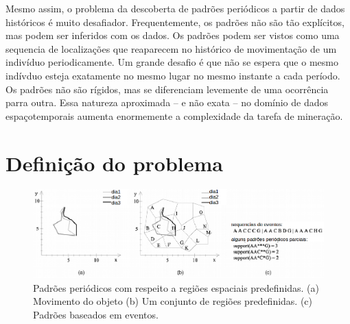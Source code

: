 \documentclass[ppgc,pep]{iiufrgs}
\begin{document}
Mesmo assim, o problema da descoberta de padrões periódicos a partir de
dados históricos é muito desafiador. Frequentemente, os padrões
não são tão explícitos, mas podem ser inferidos com os dados. Os
padrões podem ser vistos como uma sequencia de localizações que 
reaparecem no histórico de movimentação de um indivíduo periodicamente.
Um grande desafio é que não se espera que o mesmo indívduo esteja
exatamente no mesmo lugar no mesmo instante a cada período. Os
padrões não são rígidos, mas se diferenciam levemente de uma
ocorrência parra outra. Essa natureza aproximada -- e não exata --
no domínio de dados espaçotemporais aumenta enormemente a complexidade
da tarefa de mineração.








\section{Definição do problema}


\begin{figure}[h]
	\centering
	\includegraphics[width=1\textwidth]{figurinha2.png}
	\caption{Padrões periódicos com respeito a regiões espaciais predefinidas. (a) Movimento do objeto (b) Um conjunto
	de regiões predefinidas. (c) Padrões baseados em eventos.}
	\label{crisp-dm}
\end{figure}
\end{document}
